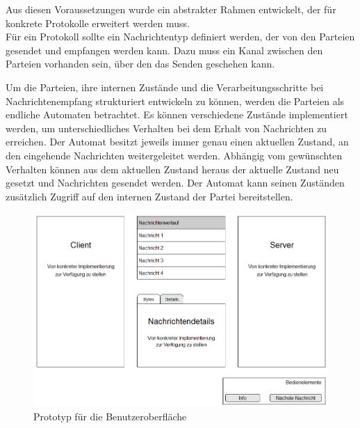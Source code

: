 Aus diesen Voraussetzungen wurde ein abstrakter Rahmen entwickelt, der für konkrete Protokolle erweitert werden muss.\\
Für ein Protokoll sollte ein Nachrichtentyp definiert werden, der von den Parteien gesendet und empfangen werden kann. Dazu muss ein Kanal zwischen den Parteien vorhanden sein, über den das Senden geschehen kann.

Um die Parteien, ihre internen Zustände und die Verarbeitungsschritte bei Nachrichtenempfang strukturiert entwickeln zu können, werden die Parteien als endliche Automaten betrachtet. Es können verschiedene Zustände implementiert werden, um unterschiedliches Verhalten bei dem Erhalt von Nachrichten zu erreichen. Der Automat besitzt jeweils immer genau einen aktuellen Zustand, an den eingehende Nachrichten weitergeleitet werden. Abhängig vom gewünschten Verhalten können aus dem aktuellen Zustand heraus der aktuelle Zustand neu gesetzt und Nachrichten gesendet werden. Der Automat kann seinen Zuständen zusätzlich Zugriff auf den internen Zustand der Partei bereitstellen.

\begin{figure}
	\centering
	\includegraphics[width=15cm]{Diagrams/SketchUI.png} %
	\caption{Prototyp für die Benutzeroberfläche}
	\label{fig_ui_sketch}
\end{figure}

